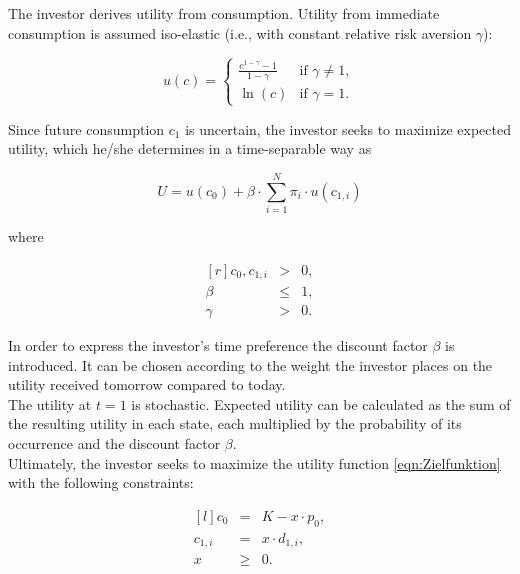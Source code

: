 \noindent The investor derives utility from consumption. Utility from immediate consumption is assumed iso-elastic (i.e., with constant relative risk aversion $\gamma$):

\begin{equation} \label{eqn:isoelastic}
    u(c) = \left\{ \begin{matrix}
                \frac{c^{1-\gamma}-1}{1-\gamma} & \text{if } \gamma \neq 1 , \\
                \ln(c) & \text{if } \gamma = 1.
            \end{matrix}\right.
\end{equation}

\bigskip

\noindent Since future consumption $c_1$ is uncertain, the investor seeks to maximize expected utility, which he/she determines in a time-separable way as 

\begin{equation}\label{eqn:Zielfunktion}
    U = u(c_0) + \beta \cdot \sum_{i=1}^{N} \pi_i \cdot u(c_{1,i})
\end{equation}

\smallskip

\noindent where

\begin{equation}
    \begin{matrix*}[r]
        c_0, c_{1,i} & > & 0,\\
        \beta & \leq & 1,\\
        \gamma & > & 0.
    \end{matrix*}
\end{equation}

\bigskip

\noindent In order to express the investor's time preference the discount factor $\beta$ is introduced. It can be chosen according to the weight the investor places on the utility received tomorrow compared to today.\\
The utility at $t = 1$ is stochastic. Expected utility can be calculated as the sum of the resulting utility in each state, each multiplied by the probability of its occurrence and the discount factor $\beta$.\\

\noindent Ultimately, the investor seeks to maximize the utility function \eqref{eqn:Zielfunktion} with the following constraints:

\begin{equation}\label{eq:scenario1_constraints}
    \begin{matrix*}[l]
        c_0 & = & K - x \cdot p_0, \\
        c_{1,i} & = & x \cdot d_{1,i},\\
        x & \geq & 0.
    \end{matrix*}
\end{equation}


